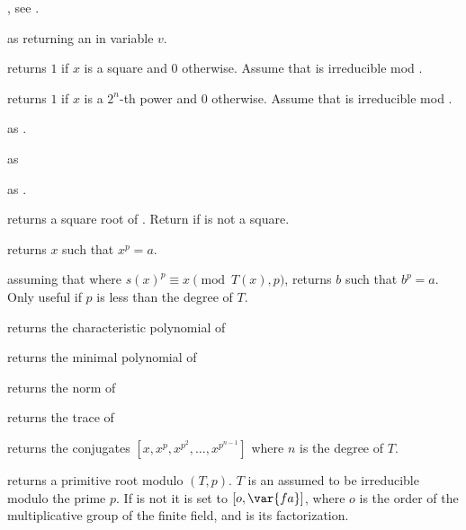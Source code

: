 ,
see .

 as
 returning an  in variable $v$.

 returns $1$ if $x$ is a square
and $0$ otherwise. Assume that  is irreducible mod .

 returns $1$ if $x$ is
a $2^n$-th power and $0$ otherwise. Assume that  is irreducible mod
.

as .

as 

 as
.

 returns a square root of .
Return  if  is not a square.

 returns $x$ such that $x^p = a$.

 assuming that
 where $s(x)^p \equiv x\pmod{T(x),p}$,
returns $b$ such that $b^p=a$. Only useful if $p$ is less than the degree of
$T$.

 returns the characteristic
polynomial of 

 returns the minimal polynomial
of 

 returns the norm of 

 returns the trace of 

 returns the conjugates
$[x,x^p,x^{p^2},\ldots,x^{p^{n-1}}]$ where $n$ is the degree of $T$.

 returns a primitive root modulo
$(T,p)$. $T$ is an  assumed to be irreducible modulo the prime
$p$. If  is not  it is set to $[o,\var{fa}]$, where $o$ is the
order of the multiplicative group of the finite field, and  is
its factorization.

